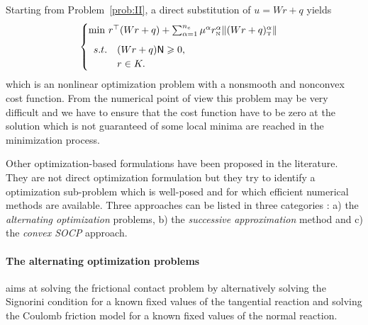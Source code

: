 Starting from Problem~\ref{prob:II}, a direct substitution of $u = Wr +q$ yields
\begin{equation}
  \label{eq:opt-3}
  \begin{cases}
    \min\, r^\top (Wr+q) + \sum _{\alpha=1}^{n_c} \mu^\alpha r_\n^\alpha \|(Wr+q)_\t^\alpha\| \\[2mm]
    \begin{array}{ll}
      s.t. &(W r + q){\sf N} \geq 0, \\
      &r \in K.
    \end{array}
  \end{cases}
\end{equation}
which is an nonlinear optimization problem with a nonsmooth and nonconvex cost function.  From the numerical point of view this problem may be very difficult and we have to ensure that the cost function have to be zero at the solution which is not guaranteed of some local minima are reached in the minimization process.

Other optimization-based formulations have been proposed in the literature. They are not direct optimization formulation but they try to identify a optimization sub-problem which is well-posed and for which efficient numerical methods are available. Three approaches can be listed in three categories : a)  the \textit{alternating optimization} problems, b) the \textit{successive approximation} method and c)  the \textit{convex SOCP} approach.


\paragraph{The alternating optimization problems} aims at solving the frictional contact problem by alternatively solving the Signorini condition for a known fixed values of the tangential reaction and solving the Coulomb friction model for a known fixed values of the normal reaction. 

